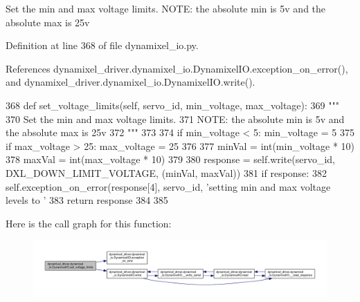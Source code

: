 \begin{DoxyVerb}Set the min and max voltage limits.
NOTE: the absolute min is 5v and the absolute max is 25v
\end{DoxyVerb}
 

Definition at line 368 of file dynamixel\+\_\+io.\+py.



References dynamixel\+\_\+driver.\+dynamixel\+\_\+io.\+Dynamixel\+I\+O.\+exception\+\_\+on\+\_\+error(), and dynamixel\+\_\+driver.\+dynamixel\+\_\+io.\+Dynamixel\+I\+O.\+write().


\begin{DoxyCode}
368     \textcolor{keyword}{def }set\_voltage\_limits(self, servo\_id, min\_voltage, max\_voltage):
369         \textcolor{stringliteral}{"""}
370 \textcolor{stringliteral}{        Set the min and max voltage limits.}
371 \textcolor{stringliteral}{        NOTE: the absolute min is 5v and the absolute max is 25v}
372 \textcolor{stringliteral}{        """}
373 
374         \textcolor{keywordflow}{if} min\_voltage < 5: min\_voltage = 5
375         \textcolor{keywordflow}{if} max\_voltage > 25: max\_voltage = 25
376 
377         minVal = int(min\_voltage * 10)
378         maxVal = int(max\_voltage * 10)
379 
380         response = self.write(servo\_id, DXL\_DOWN\_LIMIT\_VOLTAGE, (minVal, maxVal))
381         \textcolor{keywordflow}{if} response:
382             self.exception\_on\_error(response[4], servo\_id, \textcolor{stringliteral}{'setting min and max voltage levels to %
      '} %
383         \textcolor{keywordflow}{return} response
384 
385 
\end{DoxyCode}
Here is the call graph for this function\+:
\nopagebreak
\begin{figure}[H]
\begin{center}
\leavevmode
\includegraphics[width=350pt]{dd/d77/classdynamixel__driver_1_1dynamixel__io_1_1_dynamixel_i_o_a993cc60ca00c86d68fbc1cf342e51181_cgraph}
\end{center}
\end{figure}
\mbox{\label{classdynamixel__driver_1_1dynamixel__io_1_1_dynamixel_i_o_aa61b3e4c17b04db3e5fa94f4f81a961d}} 
